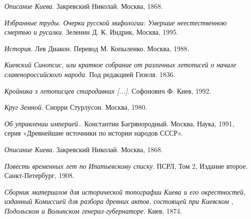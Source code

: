 \emph{Описание Киева}. Закревский Николай. Москва, 1868.

\emph{Избранные труды. Очерки русской мифологии: Умершие неестественною смертью и русалки}. Зеленин Д. К. Индрик, Москва, 1995.

\emph{История}. Лев Диакон. Перевод М. Копыленко. Москва, 1988.

\emph{Киевский Синопсис, или краткое собрание от различных летописей о начале славенороссийского народа}. Под редакцией Гизеля. 1836.

\emph{Кройника з летописцев стародавних [...]}. Софонович Ф. Киев, 1992.

\emph{Круг Земной}. Снорри Стурлусон. Москва, 1980.

\emph{Об управлении империей.}. Константин Багрянородный. Москва, Наука, 1991, серия «Древнейшие источники по истории народов СССР».

\emph{Описание Киева}. Закревский Николай. Москва, 1868.

\emph{Повесть временных лет по Ипатьевскому списку}. ПСРЛ, Том 2, Издание второе. Санкт-Петербург, 1908. 

\emph{Сборник материалов для исторической топографии Киева и его окрестностей, изданный Комиссией для разбора древних актов, состоящей при Киевском , Подольском и Волынском генерал-губернаторе}. Киев, 1874.

